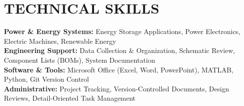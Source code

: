\documentclass[letterpaper,11pt]{article}
\begin{document}
\section{TECHNICAL SKILLS}
 \begin{itemize}[leftmargin=0.15in, label={}]
    \small{\item{
     \textbf{Power \& Energy Systems:} Energy Storage Applications, Power Electronics, Electric Machines, Renewable Energy \\
     \textbf{Engineering Support:} Data Collection \& Organization, Schematic Review, Component Lists (BOMs), System Documentation \\
     \textbf{Software \& Tools:} Microsoft Office (Excel, Word, PowerPoint), MATLAB, Python, Git Version Control \\
     \textbf{Administrative:} Project Tracking, Version-Controlled Documents, Design Reviews, Detail-Oriented Task Management
    }}
 \end{itemize}


\end{document}
